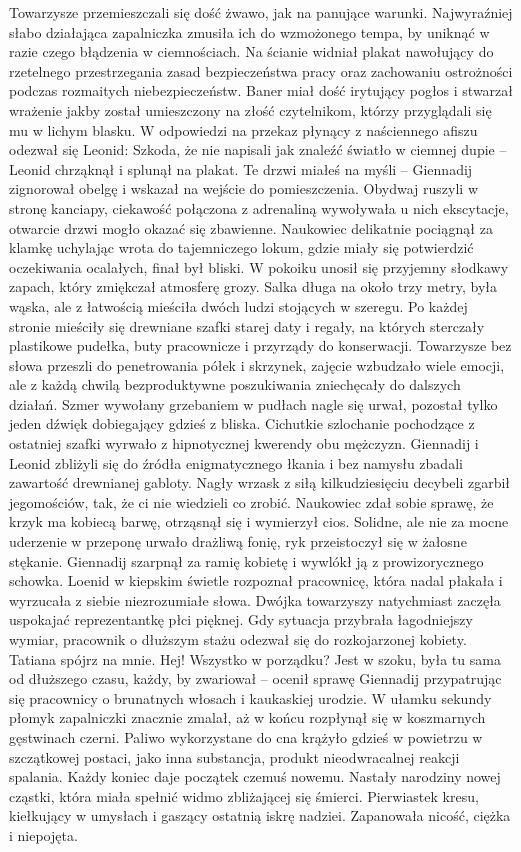 \documentclass[../MAIN.tex]{subfiles}
\begin{document}
Towarzysze przemieszczali się dość żwawo, jak na panujące warunki. Najwyraźniej słabo działająca zapalniczka zmusiła ich do wzmożonego tempa, by uniknąć w razie czego błądzenia w ciemnościach. 
Na ścianie widniał plakat nawołujący do rzetelnego przestrzegania zasad bezpieczeństwa pracy oraz zachowaniu ostrożności podczas rozmaitych niebezpieczeństw. Baner miał dość irytujący pogłos i stwarzał wrażenie jakby został umieszczony na złość czytelnikom, którzy przyglądali się mu w lichym blasku. W odpowiedzi na przekaz płynący z naściennego afiszu odezwał się Leonid: 
\sx Szkoda, że nie napisali jak znaleźć światło w ciemnej dupie -- Leonid chrząknął i splunął na plakat.
\xx Te drzwi miałeś na myśli -- Giennadij zignorował obelgę i wskazał na wejście do pomieszczenia. 
\qd
Obydwaj ruszyli w stronę kanciapy, ciekawość połączona z adrenaliną wywoływała u nich ekscytacje, otwarcie drzwi mogło okazać się zbawienne. Naukowiec delikatnie pociągnął za klamkę uchylając wrota do tajemniczego lokum, gdzie miały się potwierdzić oczekiwania ocalałych, finał był bliski. W pokoiku unosił się przyjemny słodkawy zapach, który zmiękczał atmosferę grozy. Salka długa na około trzy metry, była wąska, ale z łatwością mieściła dwóch ludzi stojących w szeregu. Po każdej stronie mieściły się drewniane szafki starej daty i regały, na których sterczały plastikowe pudełka, buty pracownicze i przyrządy do konserwacji. Towarzysze bez słowa przeszli do penetrowania półek i skrzynek, zajęcie wzbudzało wiele emocji, ale z każdą chwilą bezproduktywne poszukiwania zniechęcały do dalszych działań. Szmer wywołany grzebaniem w pudłach nagle się urwał, pozostał tylko jeden dźwięk dobiegający gdzieś z bliska. Cichutkie szlochanie pochodzące z ostatniej szafki wyrwało z hipnotycznej kwerendy obu mężczyzn. Giennadij 
i Leonid zbliżyli się do źródła enigmatycznego łkania i bez namysłu zbadali zawartość drewnianej gabloty. Nagły wrzask z siłą kilkudziesięciu decybeli zgarbił jegomościów, tak, że ci nie wiedzieli co zrobić. Naukowiec zdał sobie sprawę, że krzyk ma kobiecą barwę, otrząsnął się i wymierzył cios. Solidne, ale nie za mocne uderzenie w przeponę urwało drażliwą fonię, ryk przeistoczył się w żałosne stękanie. Giennadij szarpnął za ramię kobietę i wywlókł ją z prowizorycznego schowka. Loenid w kiepskim świetle rozpoznał pracownicę, która nadal płakała i wyrzucała z siebie niezrozumiałe słowa. Dwójka towarzyszy natychmiast zaczęła uspokajać reprezentantkę płci pięknej. Gdy sytuacja przybrała łagodniejszy wymiar, pracownik o dłuższym stażu odezwał się do rozkojarzonej kobiety. 
\sx Tatiana spójrz na mnie. Hej! Wszystko w porządku? 
\xx Jest w szoku, była tu sama od dłuższego czasu, każdy, by zwariował -- ocenił sprawę Giennadij przypatrując się pracownicy o brunatnych włosach i kaukaskiej urodzie. 
\qd
W ułamku sekundy płomyk zapalniczki znacznie zmalał, aż w końcu rozpłynął się w koszmarnych gęstwinach czerni. Paliwo wykorzystane do cna krążyło gdzieś w powietrzu w szczątkowej postaci, jako inna substancja, produkt nieodwracalnej reakcji spalania. Każdy koniec daje początek czemuś nowemu. Nastały narodziny nowej cząstki, która miała spełnić widmo zbliżającej się śmierci. Pierwiastek kresu, kiełkujący w umysłach i gaszący ostatnią iskrę nadziei. Zapanowała nicość, ciężka i niepojęta. 
\end{document}
